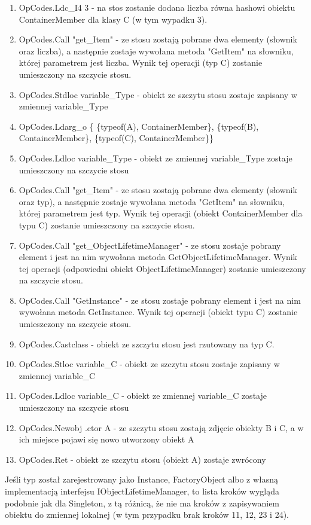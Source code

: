 \documentclass[12pt]{article}
\begin{document}
\begin{enumerate}
	\item OpCodes.Ldc\_I4 3 - na stos zostanie dodana liczba równa hashowi obiektu ContainerMember dla klasy C (w tym wypadku 3).
	\item OpCodes.Call "get\_Item" - ze stosu zostają pobrane dwa elementy (słownik oraz liczba), a następnie zostaje wywołana metoda "GetItem" na słowniku, której parametrem jest liczba. Wynik tej operacji (typ C) zostanie umieszczony na szczycie stosu.
	\item OpCodes.Stdloc variable\_Type - obiekt ze szczytu stosu zostaje zapisany w zmiennej variable\_Type
	\item OpCodes.Ldarg\_o  \{ \{typeof(A), ContainerMember\}, \{typeof(B), ContainerMember\}, \{typeof(C), ContainerMember\}\}
	\item OpCodes.Ldloc variable\_Type -  obiekt ze zmiennej variable\_Type zostaje umieszczony na szczycie stosu
	\item OpCodes.Call "get\_Item" - ze stosu zostają pobrane dwa elementy (słownik oraz typ), a następnie zostaje wywołana metoda "GetItem" na słowniku, której parametrem jest typ. Wynik tej operacji (obiekt ContainerMember dla typu C) zostanie umieszczony na szczycie stosu.
	\item OpCodes.Call "get\_ObjectLifetimeManager" - ze stosu zostaje pobrany element i jest na nim wywołana metoda GetObjectLifetimeManager. Wynik tej operacji (odpowiedni obiekt ObjectLifetimeManager) zostanie umieszczony na szczycie stosu.
	\item OpCodes.Call "GetInstance" - ze stosu zostaje pobrany element i jest na nim wywołana metoda GetInstance. Wynik tej operacji (obiekt typu C) zostanie umieszczony na szczycie stosu.
	\item OpCodes.Castclass - obiekt ze szczytu stosu jest rzutowany na typ C.
	\item OpCodes.Stloc variable\_C - obiekt ze szczytu stosu zostaje zapisany w zmiennej variable\_C
	\item OpCodes.Ldloc variable\_C - obiekt ze zmiennej variable\_C zostaje umieszczony na szczycie stosu
	\item OpCodes.Newobj .ctor A - ze szczytu stosu zostają zdjęcie obiekty B i C, a w ich miejsce pojawi się nowo utworzony obiekt A
	\item OpCodes.Ret - obiekt ze szczytu stosu (obiekt A) zostaje zwrócony
\end{enumerate}
Jeśli typ został zarejestrowany jako Instance, FactoryObject albo z własną implementacją interfejsu IObjectLifetimeManager, to lista kroków wygląda podobnie jak dla Singleton, z tą różnicą, że nie ma kroków z zapisywaniem obiektu do zmiennej lokalnej (w tym przypadku brak kroków 11, 12, 23 i 24).
\end{document}
